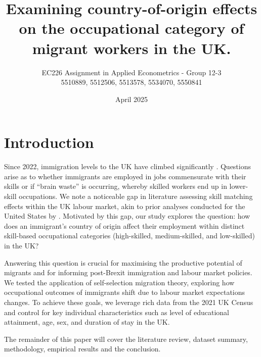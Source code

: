 \documentclass[12pt, a4paper]{article}
\title{Examining country-of-origin effects on the occupational category of migrant workers in the UK.}
\author{EC226 Assignment in Applied Econometrics - Group 12-3\\ 5510889, 5512506, 5513578, 5534070, 5550841
}
\date{April 2025}
\begin{document}


\maketitle

\pagebreak

\section{Introduction} \label{sec:intro}




Since 2022, immigration levels to the UK have climbed significantly  \citep{ONS2023_LTIM}. Questions arise as to whether immigrants are employed in jobs commensurate with their skills or if “brain waste” is occurring, whereby skilled workers end up in lower-skill occupations. We note a noticeable gap in literature assessing skill matching effects within the UK labour market, akin to prior analyses conducted for the United States by \citet{MattooBrainWaste}. Motivated by this gap, our study explores the question: how does an immigrant’s country of origin affect their employment within distinct skill-based occupational categories (high-skilled, medium-skilled, and low-skilled) in the UK?

Answering this question is crucial for maximising the productive potential of migrants and for informing post-Brexit immigration and labour market policies. We tested the application of self-selection migration theory, exploring how occupational outcomes of immigrants shift due to labour market expectations changes. To achieve these goals, we leverage rich data from the 2021 UK Census and control for key individual characteristics such as level of educational attainment, age, sex, and duration of stay in the UK. 

The remainder of this paper will cover the literature review, dataset summary, methodology, empirical results and the conclusion.

\end{document}
